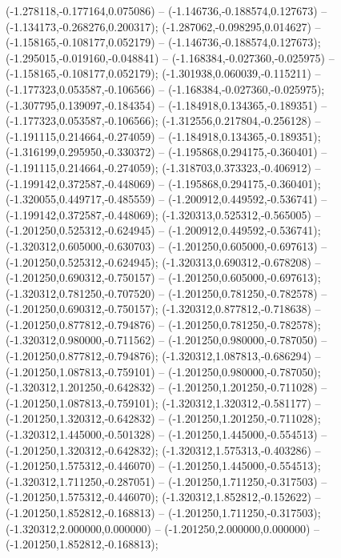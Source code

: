  (-1.278118,-0.177164,0.075086) -- (-1.146736,-0.188574,0.127673) -- (-1.134173,-0.268276,0.200317);
 (-1.287062,-0.098295,0.014627) -- (-1.158165,-0.108177,0.052179) -- (-1.146736,-0.188574,0.127673);
 (-1.295015,-0.019160,-0.048841) -- (-1.168384,-0.027360,-0.025975) -- (-1.158165,-0.108177,0.052179);
 (-1.301938,0.060039,-0.115211) -- (-1.177323,0.053587,-0.106566) -- (-1.168384,-0.027360,-0.025975);
 (-1.307795,0.139097,-0.184354) -- (-1.184918,0.134365,-0.189351) -- (-1.177323,0.053587,-0.106566);
 (-1.312556,0.217804,-0.256128) -- (-1.191115,0.214664,-0.274059) -- (-1.184918,0.134365,-0.189351);
 (-1.316199,0.295950,-0.330372) -- (-1.195868,0.294175,-0.360401) -- (-1.191115,0.214664,-0.274059);
 (-1.318703,0.373323,-0.406912) -- (-1.199142,0.372587,-0.448069) -- (-1.195868,0.294175,-0.360401);
 (-1.320055,0.449717,-0.485559) -- (-1.200912,0.449592,-0.536741) -- (-1.199142,0.372587,-0.448069);
 (-1.320313,0.525312,-0.565005) -- (-1.201250,0.525312,-0.624945) -- (-1.200912,0.449592,-0.536741);
 (-1.320312,0.605000,-0.630703) -- (-1.201250,0.605000,-0.697613) -- (-1.201250,0.525312,-0.624945);
 (-1.320313,0.690312,-0.678208) -- (-1.201250,0.690312,-0.750157) -- (-1.201250,0.605000,-0.697613);
 (-1.320312,0.781250,-0.707520) -- (-1.201250,0.781250,-0.782578) -- (-1.201250,0.690312,-0.750157);
 (-1.320312,0.877812,-0.718638) -- (-1.201250,0.877812,-0.794876) -- (-1.201250,0.781250,-0.782578);
 (-1.320312,0.980000,-0.711562) -- (-1.201250,0.980000,-0.787050) -- (-1.201250,0.877812,-0.794876);
 (-1.320312,1.087813,-0.686294) -- (-1.201250,1.087813,-0.759101) -- (-1.201250,0.980000,-0.787050);
 (-1.320312,1.201250,-0.642832) -- (-1.201250,1.201250,-0.711028) -- (-1.201250,1.087813,-0.759101);
 (-1.320312,1.320312,-0.581177) -- (-1.201250,1.320312,-0.642832) -- (-1.201250,1.201250,-0.711028);
 (-1.320312,1.445000,-0.501328) -- (-1.201250,1.445000,-0.554513) -- (-1.201250,1.320312,-0.642832);
 (-1.320312,1.575313,-0.403286) -- (-1.201250,1.575312,-0.446070) -- (-1.201250,1.445000,-0.554513);
 (-1.320312,1.711250,-0.287051) -- (-1.201250,1.711250,-0.317503) -- (-1.201250,1.575312,-0.446070);
 (-1.320312,1.852812,-0.152622) -- (-1.201250,1.852812,-0.168813) -- (-1.201250,1.711250,-0.317503);
 (-1.320312,2.000000,0.000000) -- (-1.201250,2.000000,0.000000) -- (-1.201250,1.852812,-0.168813);
